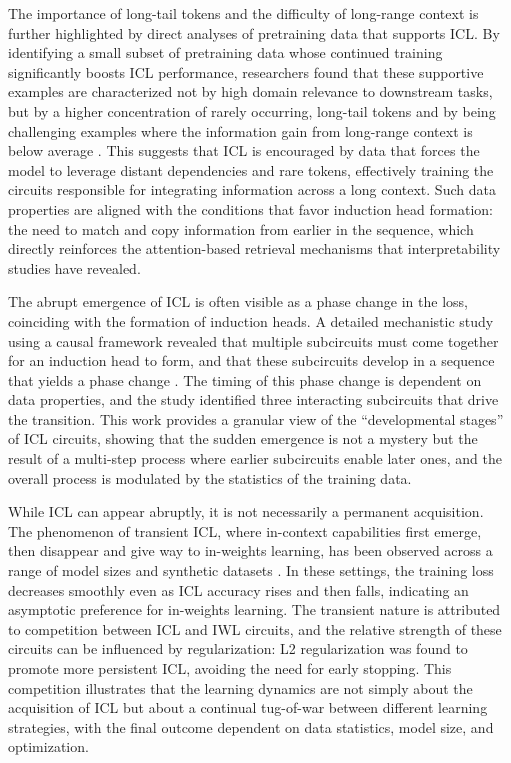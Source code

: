 \documentclass[11pt]{article}
\begin{document}
The importance of long-tail tokens and the difficulty of long-range context is further highlighted by direct analyses of pretraining data that supports ICL. By identifying a small subset of pretraining data whose continued training significantly boosts ICL performance, researchers found that these supportive examples are characterized not by high domain relevance to downstream tasks, but by a higher concentration of rarely occurring, long-tail tokens and by being challenging examples where the information gain from long-range context is below average \cite{ref36}. This suggests that ICL is encouraged by data that forces the model to leverage distant dependencies and rare tokens, effectively training the circuits responsible for integrating information across a long context. Such data properties are aligned with the conditions that favor induction head formation: the need to match and copy information from earlier in the sequence, which directly reinforces the attention-based retrieval mechanisms that interpretability studies have revealed.

The abrupt emergence of ICL is often visible as a phase change in the loss, coinciding with the formation of induction heads. A detailed mechanistic study using a causal framework revealed that multiple subcircuits must come together for an induction head to form, and that these subcircuits develop in a sequence that yields a phase change \cite{ref51}. The timing of this phase change is dependent on data properties, and the study identified three interacting subcircuits that drive the transition. This work provides a granular view of the ``developmental stages'' of ICL circuits, showing that the sudden emergence is not a mystery but the result of a multi-step process where earlier subcircuits enable later ones, and the overall process is modulated by the statistics of the training data.

While ICL can appear abruptly, it is not necessarily a permanent acquisition. The phenomenon of transient ICL, where in-context capabilities first emerge, then disappear and give way to in-weights learning, has been observed across a range of model sizes and synthetic datasets \cite{ref53}. In these settings, the training loss decreases smoothly even as ICL accuracy rises and then falls, indicating an asymptotic preference for in-weights learning. The transient nature is attributed to competition between ICL and IWL circuits, and the relative strength of these circuits can be influenced by regularization: L2 regularization was found to promote more persistent ICL, avoiding the need for early stopping. This competition illustrates that the learning dynamics are not simply about the acquisition of ICL but about a continual tug-of-war between different learning strategies, with the final outcome dependent on data statistics, model size, and optimization.
\end{document}

